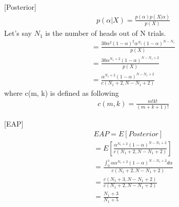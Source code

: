 \documentclass[11pt]{article}
\theoremstyle{definition}
\begin{document}
[Posterior]
\begin{eqnarray}
 p(\alpha | X ) =  \frac{p(\alpha)p(X|\alpha)}{p(X)} \nonumber
\end{eqnarray}
Let's say $N_1$ is the number of heads out of N trials.
\begin{eqnarray}
= \frac{30\alpha^2(1-\alpha)^2\alpha^{N_1} (1-\alpha)^{N-{N_1}}}{p(X)} \nonumber \\
= \frac{30\alpha^{N_1+2} (1-\alpha)^{N-{N_1}+2}}{p(X)} \nonumber \\
= \frac{\alpha^{N_1+2} (1-\alpha)^{N-{N_1}+2}}{c(N_1 +2, N - N_1 +2)} \nonumber
\end{eqnarray}
where c(m, k) is defined as following
\begin{eqnarray}
c(m, k) = \frac{m!k!}{(m+k+1)!} \nonumber
\end{eqnarray}

[EAP]
\begin{eqnarray}
EAP = E[Posterior] \nonumber \\
= E[\frac{\alpha^{N_1+2} (1-\alpha)^{N-{N_1}+2}}{c(N_1 +2, N - N_1 +2)}] \nonumber \\
= \frac{\int_{0}^{1}\alpha \alpha^{N_1+2} (1-\alpha)^{N-{N_1}+2} d\alpha}{c(N_1 +2, N - N_1 +2)} \nonumber \\
= \frac{c(N_1 +3, N - N_1 +2)}{c(N_1 +2, N - N_1 +2)} \nonumber \\
= \frac{N_1 + 3}{N_1 + 5}
\end{eqnarray}
\end{document}

